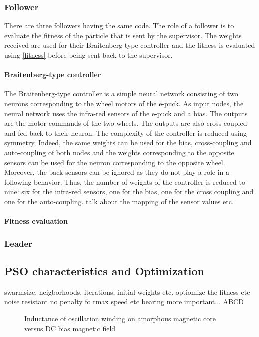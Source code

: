 \documentclass[a4, 10 pt, conference]{ieeeconf}  %
\begin{document}
\subsubsection{Follower}
There are three followers having the same code. The role of a follower is to evaluate the fitness of the particle that is sent by the supervisor. The weights received are used for their Braitenberg-type controller and the fitness is evaluated using \ref{fitness} before being sent back to the supervisor.
\paragraph{Braitenberg-type controller}
The Braitenberg-type controller is a simple neural network consisting of two neurons corresponding to the wheel motors of the e-puck. As input nodes, the neural network uses the infra-red sensors of the e-puck  and a bias. The outputs are the motor commands of the two wheels. The outputs are also cross-coupled and fed back to their neuron. The complexity of the controller is reduced using symmetry. Indeed, the same weights can be used for the bias, cross-coupling and auto-coupling of both nodes and the weights corresponding to the opposite sensors can be used for the neuron corresponding to the opposite wheel. Moreover, the back sensors can be ignored as they do not play a role in a following behavior. Thus, the number of weights of the controller is reduced to nine: six for the infra-red sensors, one for the bias, one for the cross coupling and one for the auto-coupling.
talk about the mapping of the sensor values etc.
\paragraph{Fitness evaluation}

\subsubsection{Leader}

\subsection{PSO characteristics and Optimization}
swarmsize, neigborhoods, iterations, initial weights etc.
optiomize the fitness etc noise resistant
no penalty fo rmax speed etc
bearing more important... ABCD




   \begin{figure}[thpb]
      \centering
      \caption{Inductance of oscillation winding on amorphous
       magnetic core versus DC bias magnetic field}
      \label{figurelabel}
   \end{figure}
\end{document}
